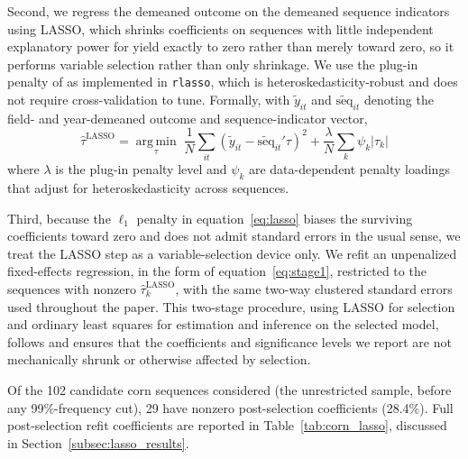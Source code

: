 \documentclass[12pt,letterpaper]{article}
\theoremstyle{remark}
\theoremstyle{remark}
\theoremstyle{plain}
\theoremstyle{definition}
\begin{document}
Second, we regress the demeaned outcome on the demeaned sequence indicators using LASSO, which shrinks coefficients on sequences with little independent explanatory power for yield exactly to zero rather than merely toward zero, so it performs variable selection rather than only shrinkage. We use the plug-in penalty of \citet{Belloni2014} as implemented in \texttt{rlasso}, which is heteroskedasticity-robust and does not require cross-validation to tune. Formally, with $\tilde{y}_{it}$ and $\tilde{\text{seq}}_{it}$ denoting the field- and year-demeaned outcome and sequence-indicator vector,
%
\begin{equation}
  \hat{\tau}^{\text{LASSO}} = \operatorname*{arg\,min}_{\tau} \; \frac{1}{N}\sum_{it}\left(\tilde{y}_{it} - \tilde{\text{seq}}_{it}'\tau\right)^2 + \frac{\lambda}{N}\sum_{k}\psi_k|\tau_k|
  \label{eq:lasso}
\end{equation}
%
where $\lambda$ is the plug-in penalty level and $\psi_k$ are data-dependent penalty loadings that adjust for heteroskedasticity across sequences.

Third, because the $\ell_1$ penalty in equation~\eqref{eq:lasso} biases the surviving coefficients toward zero and does not admit standard errors in the usual sense, we treat the LASSO step as a variable-selection device only. We refit an unpenalized fixed-effects regression, in the form of equation~\eqref{eq:stage1}, restricted to the sequences with nonzero $\hat{\tau}^{\text{LASSO}}_k$, with the same two-way clustered standard errors used throughout the paper. This two-stage procedure, using LASSO for selection and ordinary least squares for estimation and inference on the selected model, follows \citet{Belloni2014} and ensures that the coefficients and significance levels we report are not mechanically shrunk or otherwise affected by selection.

Of the 102 candidate corn sequences considered (the unrestricted sample, before any 99\%-frequency cut), 29 have nonzero post-selection coefficients (28.4\%). Full post-selection refit coefficients are reported in Table~\ref{tab:corn_lasso}, discussed in Section~\ref{subsec:lasso_results}.
\end{document}

